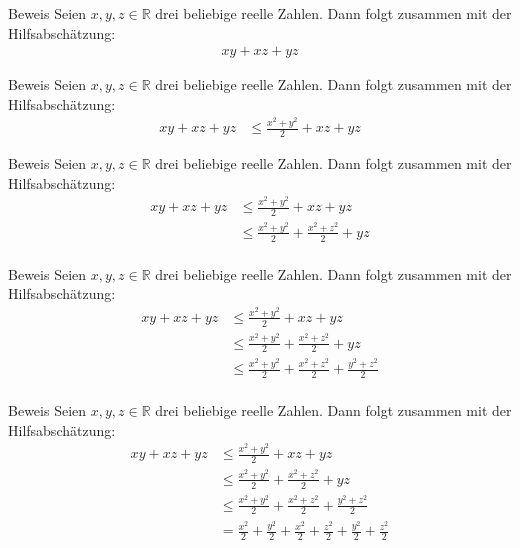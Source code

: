 \documentclass[10pt]{beamer}
\def\bR{\mathbb{R}}
\begin{document}
\begin{frame}{Beweis}
    Seien \( x, y, z \in \bR \) drei beliebige reelle Zahlen. Dann folgt zusammen mit der Hilfsabschätzung:
    \begin{align*}
        xy + xz + yz
    \end{align*}
\end{frame}



\begin{frame}{Beweis}
    Seien \( x, y, z \in \bR \) drei beliebige reelle Zahlen. Dann folgt zusammen mit der Hilfsabschätzung:
    \begin{align*}
        xy + xz + yz
        & \leq \frac{x^{2} + y^{2}}{2} + xz + yz
    \end{align*}
\end{frame}



\begin{frame}{Beweis}
    Seien \( x, y, z \in \bR \) drei beliebige reelle Zahlen. Dann folgt zusammen mit der Hilfsabschätzung:
    \begin{align*}
        xy + xz + yz
        & \leq \frac{x^{2} + y^{2}}{2} + xz + yz \\
        & \leq \frac{x^{2} + y^{2}}{2} + \frac{x^{2} + z^{2}}{2} + yz \\
    \end{align*}
\end{frame}



\begin{frame}{Beweis}
    Seien \( x, y, z \in \bR \) drei beliebige reelle Zahlen. Dann folgt zusammen mit der Hilfsabschätzung:
    \begin{align*}
        xy + xz + yz
        & \leq \frac{x^{2} + y^{2}}{2} + xz + yz \\
        & \leq \frac{x^{2} + y^{2}}{2} + \frac{x^{2} + z^{2}}{2} + yz \\
        & \leq \frac{x^{2} + y^{2}}{2} + \frac{x^{2} + z^{2}}{2} + \frac{y^{2} + z^{2}}{2} \\
    \end{align*}
\end{frame}



\begin{frame}{Beweis}
    Seien \( x, y, z \in \bR \) drei beliebige reelle Zahlen. Dann folgt zusammen mit der Hilfsabschätzung:
    \begin{align*}
        xy + xz + yz
        & \leq \frac{x^{2} + y^{2}}{2} + xz + yz \\
        & \leq \frac{x^{2} + y^{2}}{2} + \frac{x^{2} + z^{2}}{2} + yz \\
        & \leq \frac{x^{2} + y^{2}}{2} + \frac{x^{2} + z^{2}}{2} + \frac{y^{2} + z^{2}}{2} \\
        & = \frac{x^{2}}{2} + \frac{y^{2}}{2} + \frac{x^{2}}{2} + \frac{z^{2}}{2} + \frac{y^{2}}{2} + \frac{z^{2}}{2} \\
    \end{align*}
\end{frame}
\end{document}
